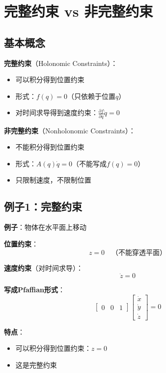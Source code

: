 \documentclass[12pt,a4paper]{article}
\begin{document}
\section{完整约束 vs 非完整约束}

\subsection{基本概念}

\textbf{完整约束}（Holonomic Constraints）：
\begin{itemize}
\item 可以积分得到位置约束
\item 形式：$f(q) = 0$（只依赖于位置$q$）
\item 对时间求导得到速度约束：$\frac{\partial f}{\partial q}\dot{q} = 0$
\end{itemize}

\textbf{非完整约束}（Nonholonomic Constraints）：
\begin{itemize}
\item 不能积分得到位置约束
\item 形式：$A(q)\dot{q} = 0$（不能写成$f(q) = 0$）
\item 只限制速度，不限制位置
\end{itemize}

\subsection{例子1：完整约束}

\textbf{例子}：物体在水平面上移动

\textbf{位置约束}：
\begin{equation}
z = 0 \quad \text{（不能穿透平面）}
\end{equation}

\textbf{速度约束}（对时间求导）：
\begin{equation}
\dot{z} = 0
\end{equation}

\textbf{写成Pfaffian形式}：
\begin{equation}
\begin{bmatrix} 0 & 0 & 1 \end{bmatrix} \begin{bmatrix} \dot{x} \\ \dot{y} \\ \dot{z} \end{bmatrix} = 0
\end{equation}

\textbf{特点}：
\begin{itemize}
\item 可以积分得到位置约束：$z = 0$
\item 这是完整约束
\end{itemize}
\end{document}
